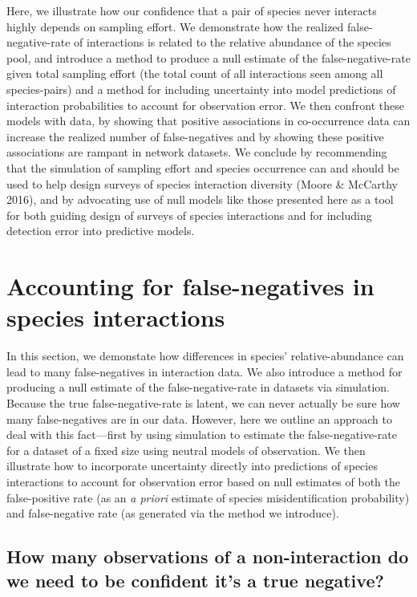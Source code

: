 \documentclass[10pt,oneside]{article}
\begin{document}
Here, we illustrate how our confidence that a pair of species never
interacts highly depends on sampling effort. We demonstrate how the
realized false-negative-rate of interactions is related to the relative
abundance of the species pool, and introduce a method to produce a null
estimate of the false-negative-rate given total sampling effort (the
total count of all interactions seen among all species-pairs) and a
method for including uncertainty into model predictions of interaction
probabilities to account for observation error. We then confront these
models with data, by showing that positive associations in co-occurrence
data can increase the realized number of false-negatives and by showing
these positive associations are rampant in network datasets. We conclude
by recommending that the simulation of sampling effort and species
occurrence can and should be used to help design surveys of species
interaction diversity (Moore \& McCarthy 2016), and by advocating use of
null models like those presented here as a tool for both guiding design
of surveys of species interactions and for including detection error
into predictive models.

\hypertarget{accounting-for-false-negatives-in-species-interactions}{%
\section{Accounting for false-negatives in species
interactions}\label{accounting-for-false-negatives-in-species-interactions}}

In this section, we demonstate how differences in species'
relative-abundance can lead to many false-negatives in interaction data.
We also introduce a method for producing a null estimate of the
false-negative-rate in datasets via simulation. Because the true
false-negative-rate is latent, we can never actually be sure how many
false-negatives are in our data. However, here we outline an approach to
deal with this fact---first by using simulation to estimate the
false-negative-rate for a dataset of a fixed size using neutral models
of observation. We then illustrate how to incorporate uncertainty
directly into predictions of species interactions to account for
observation error based on null estimates of both the false-positive
rate (as an \emph{a priori} estimate of species misidentification
probability) and false-negative rate (as generated via the method we
introduce).

\hypertarget{how-many-observations-of-a-non-interaction-do-we-need-to-be-confident-its-a-true-negative}{%
\subsection{How many observations of a non-interaction do we need to be
confident it's a true
negative?}\label{how-many-observations-of-a-non-interaction-do-we-need-to-be-confident-its-a-true-negative}}
\end{document}
